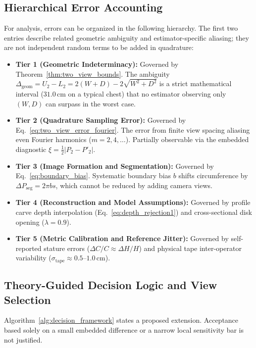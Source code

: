 \documentclass[journal]{IEEEtran}
\begin{document}
\subsection{Hierarchical Error Accounting}
For analysis, errors can be organized in the following hierarchy. The first two entries describe related geometric ambiguity and estimator-specific aliasing; they are not independent random terms to be added in quadrature:
\begin{itemize}
    \item \textbf{Tier 1 (Geometric Indeterminacy):} Governed by Theorem~\ref{thm:two_view_bounds}. The ambiguity $\Delta_{\text{geom}} = U_2 - L_2 = 2(W+D) - 2\sqrt{W^2+D^2}$ is a strict mathematical interval ($31.0$\,cm on a typical chest) that no estimator observing only $(W, D)$ can surpass in the worst case.
    \item \textbf{Tier 2 (Quadrature Sampling Error):} Governed by Eq.~\eqref{eq:two_view_error_fourier}. The error from finite view spacing aliasing even Fourier harmonics ($m=2,4,\dots$). Partially observable via the embedded diagnostic $\xi = \frac{1}{2}|P_2 - P'_2|$.
    \item \textbf{Tier 3 (Image Formation and Segmentation):} Governed by Eq.~\eqref{eq:boundary_bias}. Systematic boundary bias $b$ shifts circumference by $\Delta P_{\text{seg}} = 2\pi b s$, which cannot be reduced by adding camera views.
    \item \textbf{Tier 4 (Reconstruction and Model Assumptions):} Governed by profile carve depth interpolation (Eq.~\eqref{eq:depth_rejection1}) and cross-sectional disk opening ($\lambda=0.9$).
    \item \textbf{Tier 5 (Metric Calibration and Reference Jitter):} Governed by self-reported stature errors ($\Delta C / C \approx \Delta H / H$) and physical tape inter-operator variability ($\sigma_{\text{tape}} \approx 0.5$--$1.0$\,cm).
\end{itemize}

\subsection{Theory-Guided Decision Logic and View Selection}
Algorithm~\ref{alg:decision_framework} states a proposed extension. Acceptance based solely on a small embedded difference or a narrow local sensitivity bar is not justified.
\end{document}
